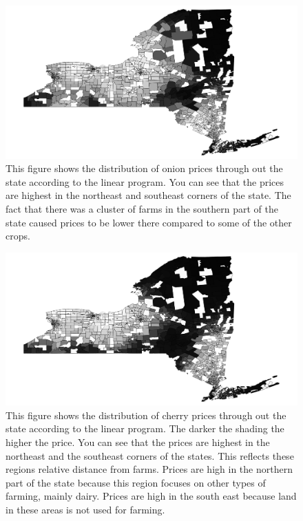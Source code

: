 \documentclass{report}
\begin{document}
\begin{figure}
\centering
\begin{framed}
\includegraphics[scale=.50]{prices_49}
\caption{This figure shows the distribution of onion prices through out the state according to the linear program. You can see that the prices are highest in the northeast and southeast corners of the state. The fact that there was a cluster of farms in the southern part of the state caused prices to be lower there compared to some of the other crops.}
\label{fig:prices_49}
\end{framed}
\end{figure}


\begin{figure}
\centering
\begin{framed}
\includegraphics[scale=.50]{prices_66}
\caption{This figure shows the distribution of cherry prices through out the state according to the linear program. The darker the shading the higher the price. You can see that the prices are highest in the northeast and the southeast corners of the states. This reflects these regions relative distance from farms. Prices are high in the northern part of the state because this region focuses on other types of farming, mainly dairy. Prices are high in the south east because land in these areas is not used for farming. }
\label{fig:prices_66}
\end{framed}
\end{figure}
\end{document}
